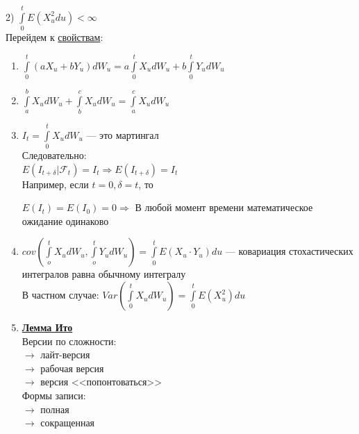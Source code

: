 \documentclass[a4paper]{article}
\begin{document}
 2) $\int\limits_{0}^{t}E(X^{2}_{u}du)<\infty$\\

 Перейдем к \underline{свойствам}:

 \begin{enumerate}[label={\theenumi)}]
 \item $\int\limits_{0}^{t}\left(aX_u+bY_u\right)dW_u=a\int\limits_{0}^{t}X_udW_u+b\int\limits_{0}^{t}Y_udW_u$\\
 \item
 $\int\limits_{a}^{b}X_udW_u+\int\limits_{b}^{c}X_udW_u=\int\limits_{a}^{c}X_udW_u$\\
 \item
 $I_t=\int\limits_{0}^{t}X_udW_u$ --- это мартингал\\

 Следовательно:\\

 $E(I_{t+\delta}|\mathcal{F}_t)=I_t \Rightarrow E(I_{t+\delta})=I_t$\\

 Например, если $t=0, \delta=t$, то

 $E(I_t)=E(I_0)=0 \Rightarrow$ В любой момент времени математическое ожидание одинаково\\

 \item\label{cov}
 $cov\left(\int\limits_{o}^{t}X_udW_u,\int\limits_{o}^{t}Y_udW_u\right)=\int\limits_{0}^{t}E\left(X_u\cdot Y_u\right)du$ --- ковариация стохастических интегралов равна обычному интегралу\\

 В частном случае: $Var\left(\int\limits_{0}^{t}X_udW_u\right)=\int\limits_{0}^{t}E\left(X^{2}_{u}\right)du$\\

 \item
 \underline{\bf \large Лемма Ито}\\

 Версии по сложности:\\
 $\rightarrow$ лайт-версия\\
 $\rightarrow$ рабочая версия\\
 $\rightarrow$ версия <<попонтоваться>>\\

 Формы записи:\\
 $\rightarrow$ полная\\
 $\rightarrow$ сокращенная

 \end{enumerate}
\end{document}

